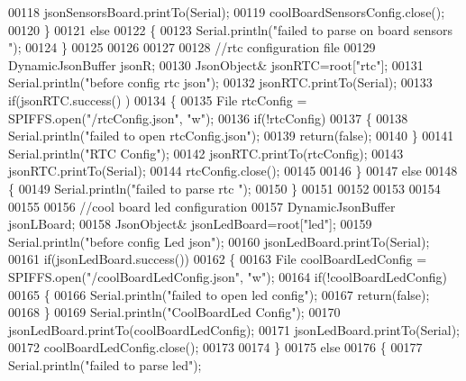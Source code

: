 \begin{DoxyCode}
00118         jsonSensorsBoard.printTo(Serial);
00119         coolBoardSensorsConfig.close();
00120     \}
00121     \textcolor{keywordflow}{else}
00122     \{
00123         Serial.println(\textcolor{stringliteral}{"failed to parse on board sensors "});    
00124     \}
00125     
00126     
00127     
00128     \textcolor{comment}{//rtc configuration file}
00129     DynamicJsonBuffer jsonR;
00130         JsonObject& jsonRTC=root[\textcolor{stringliteral}{"rtc"}];
00131     Serial.println(\textcolor{stringliteral}{"before config rtc json"});
00132     jsonRTC.printTo(Serial);
00133     \textcolor{keywordflow}{if}(jsonRTC.success() )
00134     \{
00135         File rtcConfig = SPIFFS.open(\textcolor{stringliteral}{"/rtcConfig.json"}, \textcolor{stringliteral}{"w"});   
00136         \textcolor{keywordflow}{if}(!rtcConfig)
00137         \{
00138             Serial.println(\textcolor{stringliteral}{"failed to open rtcConfig.json"});
00139             \textcolor{keywordflow}{return}(\textcolor{keyword}{false});
00140         \}
00141         Serial.println(\textcolor{stringliteral}{"RTC Config"});
00142         jsonRTC.printTo(rtcConfig);
00143         jsonRTC.printTo(Serial);
00144         rtcConfig.close();
00145     
00146     \}
00147     \textcolor{keywordflow}{else}
00148     \{
00149         Serial.println(\textcolor{stringliteral}{"failed to parse rtc "});
00150     \}
00151 
00152     
00153     
00154     
00155     
00156         \textcolor{comment}{//cool board led configuration}
00157     DynamicJsonBuffer jsonLBoard;
00158         JsonObject& jsonLedBoard=root[\textcolor{stringliteral}{"led"}];
00159     Serial.println(\textcolor{stringliteral}{"before config Led json"});
00160     jsonLedBoard.printTo(Serial);
00161     \textcolor{keywordflow}{if}(jsonLedBoard.success())
00162     \{   
00163         File coolBoardLedConfig = SPIFFS.open(\textcolor{stringliteral}{"/coolBoardLedConfig.json"}, \textcolor{stringliteral}{"w"}); 
00164         \textcolor{keywordflow}{if}(!coolBoardLedConfig)
00165         \{
00166             Serial.println(\textcolor{stringliteral}{"failed to open led config"});
00167             \textcolor{keywordflow}{return}(\textcolor{keyword}{false});
00168         \}
00169         Serial.println(\textcolor{stringliteral}{"CoolBoardLed Config"});
00170         jsonLedBoard.printTo(coolBoardLedConfig);
00171         jsonLedBoard.printTo(Serial);
00172         coolBoardLedConfig.close();
00173     
00174     \}
00175     \textcolor{keywordflow}{else}
00176     \{
00177         Serial.println(\textcolor{stringliteral}{"failed to parse led"});

\end{DoxyCode}

